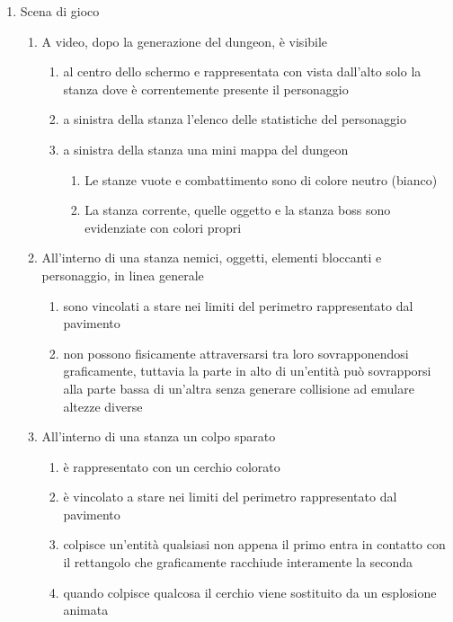 \begin{enumerate}
    \item Scena di gioco
    \begin{enumerate}
        \item A video, dopo la generazione del dungeon, è visibile
        \begin{enumerate}
            \item al centro dello schermo e rappresentata con vista dall'alto solo la stanza dove è correntemente presente il personaggio
            \item a sinistra della stanza l'elenco delle statistiche del personaggio
            \item a sinistra della stanza una mini mappa del dungeon
            \begin{enumerate}
                \item Le stanze vuote e combattimento sono di colore neutro (bianco)
                \item La stanza corrente, quelle oggetto e la stanza boss sono evidenziate con colori propri 
            \end{enumerate}
        \end{enumerate}
        \item All'interno di una stanza nemici, oggetti, elementi bloccanti e personaggio, in linea generale
            \begin{enumerate}
                \item sono vincolati a stare nei limiti del perimetro rappresentato dal pavimento
                \item non possono fisicamente attraversarsi tra loro sovrapponendosi graficamente, tuttavia la parte in alto di un'entità può sovrapporsi alla parte bassa di un'altra senza generare collisione ad emulare altezze diverse
            \end{enumerate}
        \item All'interno di una stanza un colpo sparato
        \begin{enumerate}
            \item è rappresentato con un cerchio colorato
            \item è vincolato a stare nei limiti del perimetro rappresentato dal pavimento
            \item colpisce un'entità qualsiasi non appena il primo entra in contatto con il rettangolo che graficamente racchiude interamente la seconda 
            \item quando colpisce qualcosa il cerchio viene sostituito da un esplosione animata
        \end{enumerate}
        

\end{enumerate}
\end{enumerate}
